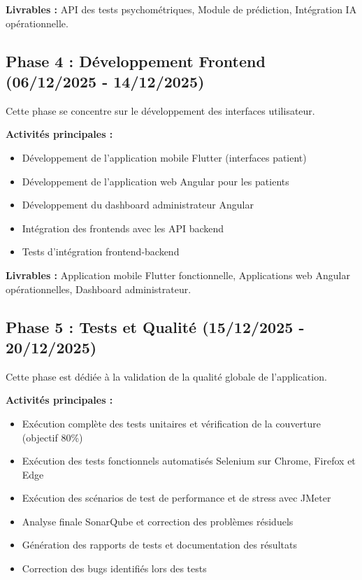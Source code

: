 \documentclass[12pt,a4paper]{report}
\begin{document}
\textbf{Livrables :} API des tests psychométriques, Module de prédiction, Intégration IA opérationnelle.

\subsection{Phase 4 : Développement Frontend (06/12/2025 - 14/12/2025)}

Cette phase se concentre sur le développement des interfaces utilisateur.

\textbf{Activités principales :}
\begin{itemize}
    \item Développement de l'application mobile Flutter (interfaces patient)
    \item Développement de l'application web Angular pour les patients
    \item Développement du dashboard administrateur Angular
    \item Intégration des frontends avec les API backend
    \item Tests d'intégration frontend-backend
\end{itemize}

\textbf{Livrables :} Application mobile Flutter fonctionnelle, Applications web Angular opérationnelles, Dashboard administrateur.

\subsection{Phase 5 : Tests et Qualité (15/12/2025 - 20/12/2025)}

Cette phase est dédiée à la validation de la qualité globale de l'application.

\textbf{Activités principales :}
\begin{itemize}
    \item Exécution complète des tests unitaires et vérification de la couverture (objectif 80\%)
    \item Exécution des tests fonctionnels automatisés Selenium sur Chrome, Firefox et Edge
    \item Exécution des scénarios de test de performance et de stress avec JMeter
    \item Analyse finale SonarQube et correction des problèmes résiduels
    \item Génération des rapports de tests et documentation des résultats
    \item Correction des bugs identifiés lors des tests
\end{itemize}
\end{document}
